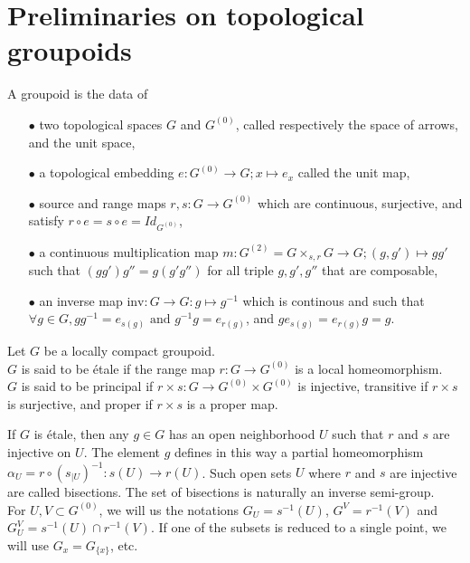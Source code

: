 \section{Preliminaries on topological groupoids}

\begin{definition}
A groupoid is the data of 
\begin{itemize}
\item[$\bullet$] two topological spaces $G$ and $G^{(0)}$, called respectively the space of arrows, and the unit space,
\item[$\bullet$] a topological embedding $e: G^{(0)}\rightarrow G; x\mapsto e_x$ called the unit map,
\item[$\bullet$] source and range maps $r,s : G\rightarrow G^{(0)}$ which are continuous, surjective, and satisfy $r\circ e = s\circ e = Id_{G^{(0)}}$,
\item[$\bullet$] a continuous multiplication map $m : G^{(2)}=G\times_{s,r}G\rightarrow G; (g,g')\mapsto gg'$ such that $(gg')g''=g(g'g'')$ for all triple $g,g',g''$ that are composable,
\item[$\bullet$] an inverse map $\text{inv} : G\rightarrow G: g\mapsto g^{-1}$ which is continous and such that $\forall g\in G, gg^{-1}=e_{s(g)} \text{ and }g^{-1}g=e_{r(g)}$, and $g e_{s(g)} = e_{r(g)} g =g$.
\end{itemize} 
\end{definition}

\begin{definition}
Let $G$ be a locally compact groupoid.\\
$G$ is said to be étale if the range map $r:G\rightarrow G^{(0)}$ is a local homeomorphism.\\
$G$ is said to be principal if $r\times s : G\rightarrow G^{(0)}\times G^{(0)}$ is injective, transitive if $r\times s $ is surjective, and proper if $r\times s $ is a proper map. 
\end{definition}

If $G$ is étale, then any $g\in G$ has an open neighborhood $U$ such that $r$ and $s$ are injective on $U$. The element $g$ defines in this way a partial homeomorphism $\alpha_U = r\circ (s_{|U})^{-1} : s(U)\rightarrow r(U)$. Such open sets $U$ where $r$ and $s$ are injective are called bisections. The set of bisections is naturally an inverse semi-group. \cite{paterson}\\

For $U,V\subset G^{(0)}$, we will us the notations $G_U=s^{-1}(U)$, $G^V=r^{-1}(V)$ and $G_U^V=s^{-1}(U)\cap r^{-1}(V)$. If one of the subsets is reduced to a single point, we will use $G_x=G_{\{x\}}$, etc. \\

